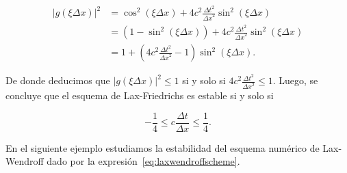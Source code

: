 \begin{example}
  \begin{align*}
    {\left|g\left(\xi\Delta x\right)\right|}^{2} & =
    \cos^{2}
    \left(\xi\Delta x\right)+
    4c^{2}
    \frac{{\Delta t}^{2}}{{\Delta x}^{2}}
    \sin^{2}
    \left(\xi\Delta x\right)                         \\
                                                 & =
    \left(
    1-
    \sin^{2}
    \left(\xi\Delta x\right)
    \right)+
    4c^{2}
    \frac{{\Delta t}^{2}}{{\Delta x}^{2}}
    \sin^{2}\left(\xi\Delta x\right)                 \\
                                                 & =
    1+
    \left(
    4c^{2}
    \frac{{\Delta t}^{2}}{{\Delta x}^{2}}-
    1
    \right)
    \sin^{2}\left(\xi\Delta x\right).
  \end{align*}

  De donde deducimos que
  \begin{math}
    {\left|
      g
      \left(
      \xi\Delta x
      \right)
      \right|}^{2}\leq
    1
  \end{math}
  si y solo si
  \begin{math}
    4c^{2}
    \frac{{\Delta t}^{2}}{{\Delta x}^{2}}\leq
    1
  \end{math}.
  Luego, se concluye que el esquema de Lax-Friedrichs es estable si
  y solo si

  \begin{equation*}
    -\frac{1}{4}\leq
    c\frac{\Delta t}{\Delta x}\leq
    \frac{1}{4}.
  \end{equation*}
\end{example}

En el siguiente ejemplo estudiamos la estabilidad del esquema
numérico de Lax-Wendroff dado por la
expresión~\eqref{eq:laxwendroffscheme}.

